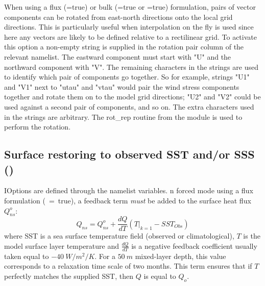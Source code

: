 When using a flux (=true) or bulk (=true or =true) formulation, 
pairs of vector components can be rotated from east-north directions onto the local grid directions.  
This is particularly useful when interpolation on the fly is used since here any vectors are likely to be defined 
relative to a rectilinear grid.
To activate this option a non-empty string is supplied in the rotation pair column of the relevant namelist.
The eastward component must start with "U" and the northward component with "V".  
The remaining characters in the strings are used to identify which pair of components go together.
So for example, strings "U1" and "V1" next to "utau" and "vtau" would pair the wind stress components together
and rotate them on to the model grid directions; "U2" and "V2" could be used against a second pair of components, 
and so on.
The extra characters used in the strings are arbitrary.
The rot\_rep routine from the  module is used to perform the rotation.

\subsection    [Surface restoring to observed SST and/or SSS (\textit{sbcssr})]
			{Surface restoring to observed SST and/or SSS ()}
\label{SBC_ssr}

IOptions are defined through the   namelist variables.
n forced mode using a flux formulation (~=~true), a 
feedback term \emph{must} be added to the surface heat flux $Q_{ns}^o$:
\begin{equation} \label{Eq_sbc_dmp_q}
Q_{ns} = Q_{ns}^o + \frac{dQ}{dT} \left( \left. T \right|_{k=1} - SST_{Obs} \right)
\end{equation}
where SST is a sea surface temperature field (observed or climatological), $T$ is 
the model surface layer temperature and $\frac{dQ}{dT}$ is a negative feedback 
coefficient usually taken equal to $-40~W/m^2/K$. For a $50~m$ 
mixed-layer depth, this value corresponds to a relaxation time scale of two months. 
This term ensures that if $T$ perfectly matches the supplied SST, then $Q$ is 
equal to $Q_o$. 

